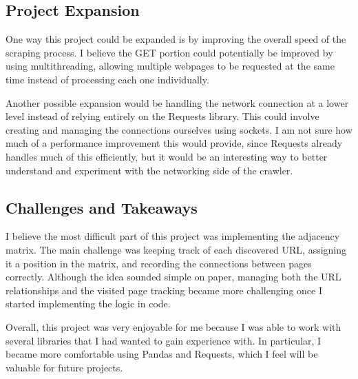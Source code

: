 \documentclass{article}
\begin{document}
\subsection{Project Expansion}

One way this project could be expanded is by improving the overall speed of the scraping process. I believe the GET portion could potentially be improved by using multithreading, allowing multiple webpages to be requested at the same time instead of processing each one individually.

Another possible expansion would be handling the network connection at a lower level instead of relying entirely on the Requests library. This could involve creating and managing the connections ourselves using sockets. I am not sure how much of a performance improvement this would provide, since Requests already handles much of this efficiently, but it would be an interesting way to better understand and experiment with the networking side of the crawler.

\vspace{0.5em}

\subsection{Challenges and Takeaways}

I believe the most difficult part of this project was implementing the adjacency matrix. The main challenge was keeping track of each discovered URL, assigning it a position in the matrix, and recording the connections between pages correctly. Although the idea sounded simple on paper, managing both the URL relationships and the visited page tracking became more challenging once I started implementing the logic in code.  

\vspace{0.5em}

Overall, this project was very enjoyable for me because I was able to work with several libraries that I had wanted to gain experience with. In particular, I became more comfortable using Pandas and Requests, which I feel will be valuable for future projects.
\end{document}
